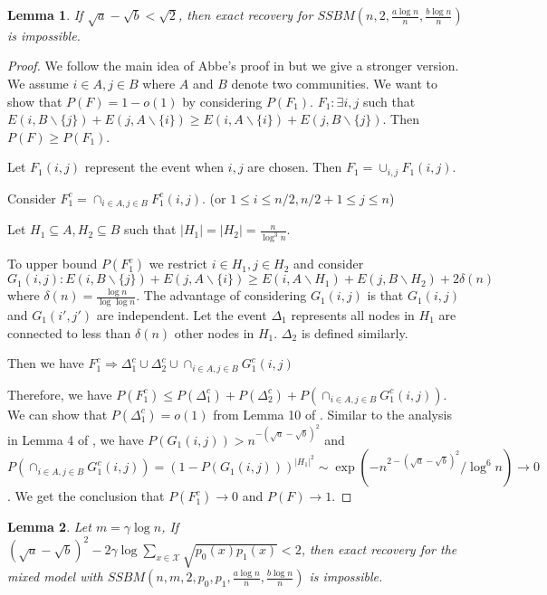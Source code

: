 \documentclass{article}
\newtheorem{lemma}{Lemma}
\begin{document}
\begin{lemma}\label{lem:ab2}
	If $\sqrt{a} - \sqrt{b} < \sqrt{2}$, then exact recovery for $SSBM(n, 2, \frac{a \log n}{n}, \frac{b \log n}{n})$
	is impossible.
\end{lemma}
\begin{proof}
	We follow the main idea of Abbe's proof in \cite{abbe} but we give a stronger version.
	We assume $i \in A, j \in B$ where $A$ and $B$ denote two communities.
	We want to show that $P(F) = 1 - o(1)$ by considering $P(F_1)$.
	$F_1: \exists i,j$ such that $E(i, B \backslash \{j\}) + E(j, A \backslash \{i\}) \geq E(i, A \backslash \{i\}) + E(j, B \backslash \{j\})$.
	Then $P(F) \geq P(F_1)$.
	
	Let $F_1(i,j)$ represent the event when $i,j$ are chosen. Then $F_1 = \cup_{i,j}F_1(i,j)$.
	
	Consider $F_1^c = \cap_{i\in A, j\in B} F_1^c(i,j)$. (or $1\leq i \leq n/2, n/2+1 \leq j \leq n$)
	
	Let $H_1\subseteq A, H_2 \subseteq B$ such that $|H_1| = |H_2| = \frac{n}{\log^3 n}$.
	
	To upper bound $P(F_1^c)$ we restrict $i \in H_1, j \in H_2$ and consider
	$G_1(i,j): E(i, B \backslash \{j\}) + E(j, A \backslash \{i\}) \geq E(i, A \backslash H_1) + E(j, B \backslash H_2) + 2\delta(n)$
	where $\delta(n) = \frac{\log n}{\log \log n}$.
	The advantage of considering $G_1(i,j)$ is that $G_1(i,j)$ and $G_1(i', j')$ are independent.
	Let the event $\Delta_1$ represents all nodes in $H_1$ are connected to less than $\delta(n)$ other nodes in $H_1$.
	$\Delta_2$ is defined similarly.
	
	Then we have $F_1^c \Rightarrow \Delta_1^c \cup \Delta_2^c \cup \cap_{i\in A, j\in B}G^c_1(i,j)$
	
	Therefore, we have $P(F_1^c) \leq P(\Delta_1^c) + P(\Delta_2^c) + P(\cap_{i\in A, j\in B}G^c_1(i,j))$.
	We can show that $P(\Delta_1^c) = o(1)$ from Lemma 10 of \cite{abbe}.
	Similar to the analysis in Lemma 4 of \cite{abbe}, we have $P(G_1(i,j)) > n^{-(\sqrt{a} - \sqrt{b})^2}$
	and $P(\cap_{i\in A, j\in B}G^c_1(i,j)) = (1 - P(G_1(i,j)))^{|H_1|^2} \sim \exp(-n^{2 - (\sqrt{a} - \sqrt{b})^2}/\log^6 n) \to 0$.
	We get the conclusion that $P(F_1^c) \to 0$ and $P(F) \to 1$.
	
\end{proof}
\begin{lemma}
	Let $m=\gamma\log n$,
	If $(\sqrt{a} - \sqrt{b})^2 - 2\gamma\log\sum_{x\in\mathcal{X}} \sqrt{p_0(x)p_1(x)} < 2$, then exact recovery for the mixed model with $SSBM(n, m, 2, p_0, p_1, \frac{a \log n}{n}, \frac{b \log n}{n})$
	is impossible.
\end{lemma}
\end{document}
